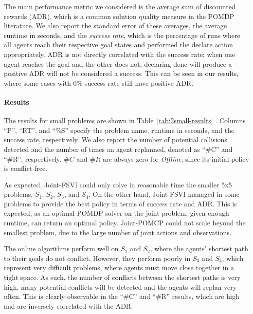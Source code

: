 \documentclass[letterpaper]{article}
\begin{document}
The main performance metric we considered is the average sum of discounted rewards (ADR), which is a common solution quality measure in the POMDP literature.
We also report the standard error of these averages, the average runtime in seconds,
and the \emph{success rate}, which is the percentage of runs where all agents reach their respective goal states and performed the declare action appropriately.
ADR is not directly correlated with the success rate: when one agent reaches the goal and the other does not, declaring done will produce a positive ADR will not be considered a success. This can be seen in our results, where some cases with 0\% success rate still have positive ADR.







\paragraph{Results}

The results for small problems are shown in Table~\ref{tab:2small-results} .
Columns ``P'', ``RT'', and ``\%S'' specify the problem name, runtime in seconds, and the success rate, respectively.
We also report the number of potential collisions detected and the number of times an agent replanned, denoted as ``\#C'' and ``\#R'', respectively.
$\#C$ and $\#R$ are always zero for \emph{Offline}, since its initial policy is conflict-free. %

As expected, Joint-FSVI could only solve in reasonable time the smaller 5x5 problems, $S_1$, $S_2$, $S_3$, and $S_4$. On the other hand, Joint-FSVI managed in some problems to provide the best policy in terms of success rate and ADR. This is expected, as an optimal POMDP solver on the joint problem, given enough runtime, can return an optimal policy. Joint-POMCP could not scale beyond  the smallest problem, due to the large number of joint actions and observations.



The online algorithms perform well on $S_1$ and $S_2$, where the agents' shortest path to their goals do not conflict.
However, they perform poorly in $S_3$ and $S_4$, which represent very difficult problems, where agents must move close together in a tight space. As such, the number of conflicts between the shortest paths is very high, many potential conflicts will be detected and the agents will replan very often. This is clearly observable in the ``\#C'' and ``\#R'' results, which are high and are inversely correlated with the ADR.
\end{document}
